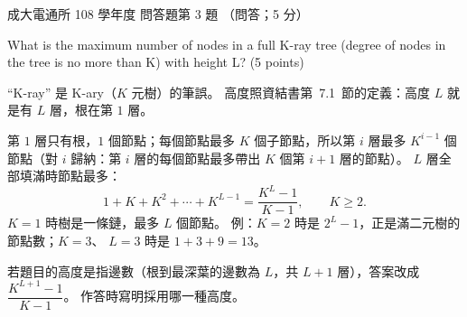 \begin{pastexam}[label={px:ncku-108-comm-ds-06}]{成大電通所 108 學年度 問答題第 3 題}
（問答；5 分）

What is the maximum number of nodes in a full K-ray tree (degree of nodes in the tree is no more than K)
with height L? (5 points)
\end{pastexam}

\begin{pastsoln}
``K-ray'' 是 K-ary（$K$ 元樹）的筆誤。 高度照資結書第~7.1~節的定義：高度 $L$ 就是有 $L$ 層，根在第
$1$ 層。

第 $1$ 層只有根，$1$ 個節點；每個節點最多 $K$ 個子節點，所以第 $i$ 層最多 $K^{i-1}$ 個節點（對 $i$
歸納：第 $i$ 層的每個節點最多帶出 $K$ 個第 $i + 1$ 層的節點）。 $L$ 層全部填滿時節點最多：
\[
1 + K + K^2 + \cdots + K^{L-1} = \frac{K^{L} - 1}{K - 1}, \qquad K \ge 2 .
\]
$K = 1$ 時樹是一條鏈，最多 $L$ 個節點。 例：$K = 2$ 時是 $2^L - 1$，正是滿二元樹的節點數；$K = 3$、
$L = 3$ 時是 $1 + 3 + 9 = 13$。

若題目的高度是指邊數（根到最深葉的邊數為 $L$，共 $L + 1$ 層），答案改成
$\dfrac{K^{L+1} - 1}{K - 1}$。 作答時寫明採用哪一種高度。
\end{pastsoln}
